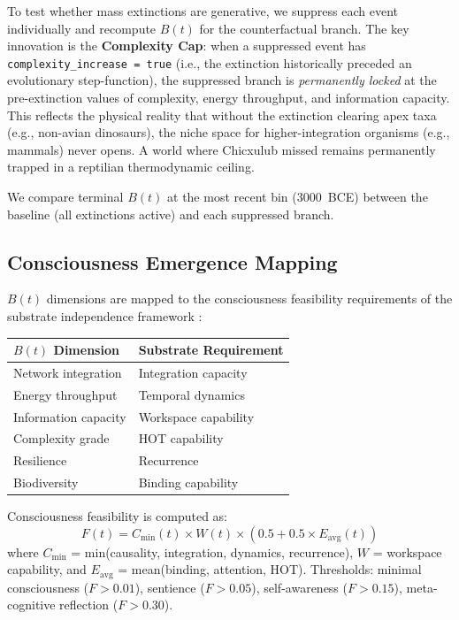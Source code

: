 \documentclass[10pt,letterpaper]{article}
\newcommand{\bt}{$B(t)$}
\begin{document}
To test whether mass extinctions are generative, we suppress each event
individually and recompute \bt{} for the counterfactual branch. The key
innovation is the \textbf{Complexity Cap}: when a suppressed event has
\texttt{complexity\_increase = true} (i.e., the extinction historically
preceded an evolutionary step-function), the suppressed branch is
\emph{permanently locked} at the pre-extinction values of complexity,
energy throughput, and information capacity. This reflects the physical
reality that without the extinction clearing apex taxa (e.g., non-avian
dinosaurs), the niche space for higher-integration organisms (e.g., mammals)
never opens. A world where Chicxulub missed remains permanently trapped in a
reptilian thermodynamic ceiling.

We compare terminal \bt{} at the most recent bin (3000~BCE) between the baseline
(all extinctions active) and each suppressed branch.

\subsection*{Consciousness Emergence Mapping}

\bt{} dimensions are mapped to the consciousness feasibility requirements of
the substrate independence framework \cite{putnam1967, tononi2004}:

\begin{center}
\begin{tabular}{ll}
\toprule
\bt{} Dimension & Substrate Requirement \\
\midrule
Network integration & Integration capacity \\
Energy throughput & Temporal dynamics \\
Information capacity & Workspace capability \\
Complexity grade & HOT capability \\
Resilience & Recurrence \\
Biodiversity & Binding capability \\
\bottomrule
\end{tabular}
\end{center}

Consciousness feasibility is computed as:
\begin{equation}
F(t) = C_\text{min}(t) \times W(t) \times (0.5 + 0.5 \times E_\text{avg}(t))
\end{equation}
where $C_\text{min}$ = min(causality, integration, dynamics, recurrence),
$W$ = workspace capability, and $E_\text{avg}$ = mean(binding, attention, HOT).
Thresholds: minimal consciousness ($F > 0.01$), sentience ($F > 0.05$),
self-awareness ($F > 0.15$), meta-cognitive reflection ($F > 0.30$).
\end{document}
